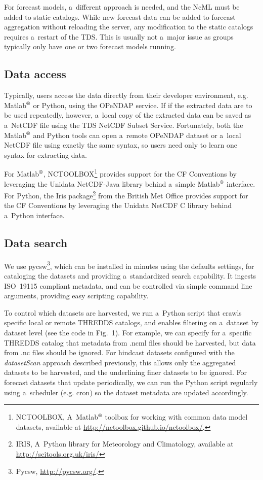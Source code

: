 \documentclass[osd, online, hvmath]{copernicus}
\begin{document}
For forecast models, a~different approach is needed, and the NcML must
be added to static catalogs. While new forecast data can be added to
forecast aggregation without reloading the server, any modification to
the static catalogs requires a~restart of the TDS. This is usually not
a~major issue as groups typically only have one or two forecast models
running.

\subsection{Data access}

Typically, users access the data directly from their developer
environment, e.g.  Matlab$^{\text{\textregistered}}$ or Python, using
the OPeNDAP service. If if the extracted data are to be used
repeatedly, however, a~local copy of the extracted data can be saved as
a~NetCDF file using the TDS NetCDF Subset Service. Fortunately, both
the Matlab$^{\text{\textregistered}}$ and Python tools can open
a~remote OPeNDAP dataset or a~local NetCDF file using exactly the same
syntax, so users need only 
to learn one syntax for extracting data.

For Matlab$^{\text{\textregistered}}$, NCTOOLBOX\footnote{NCTOOLBOX,
  A~Matlab$^{\text{\textregistered}}$ toolbox for working with common
  data model datasets, available at
  \url{http://nctoolbox.github.io/nctoolbox/}.} provides support for
the CF Conventions by leveraging the Unidata NetCDF-Java library
behind a~simple Matlab$^{\text{\textregistered}}$ interface. For
Python, the Iris package\footnote{IRIS, A~Python library for
  Meteorology and Climatology, available at
  \url{http://scitools.org.uk/iris/}} from the British Met Office
provides support for the CF Conventions by leveraging the Unidata
NetCDF C library behind a~Python interface.

\subsection{Data search}

We use pycsw\footnote{Pycsw, \url{http://pycsw.org/}.}, which can be installed
in minutes using the defaults settings, for cataloging
the datasets and providing a~standardized search capability.
It ingests ISO~19115 compliant metadata, and can be controlled via simple command
line arguments, providing easy scripting capability.

To control which datasets are harvested, we run a~Python script that
crawls specific local or remote THREDDS catalogs, and enables
filtering on a~dataset by dataset level (see the code in Fig.~1). For
example, we can specify for a~specific THREDDS catalog that metadata
from .ncml files should be harvested, but data from .nc files should be
ignored. For hindcast datasets configured with the
\textit{datasetScan} approach described previously, this allows only
the aggregated datasets to be harvested, and the underlining finer
datasets to be ignored. For forecast datasets that update
periodically, we can run the Python script regularly using a~scheduler
(e.g. cron) so the dataset metadata are updated accordingly.
\end{document}

